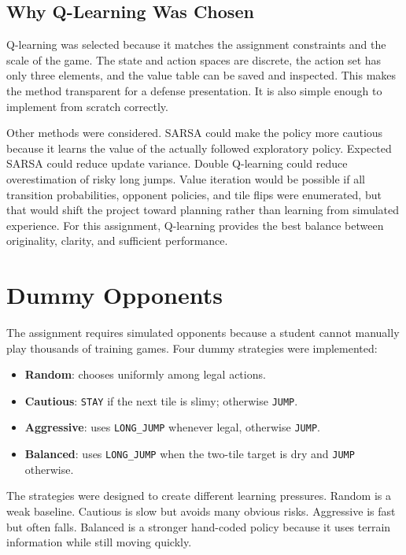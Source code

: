 \documentclass[conference]{IEEEtran}
\begin{document}
\subsection{Why Q-Learning Was Chosen}

Q-learning was selected because it matches the assignment constraints and the
scale of the game. The state and action spaces are discrete, the action set has
only three elements, and the value table can be saved and inspected. This makes the
method transparent for a defense presentation. It is also simple enough to
implement from scratch correctly.

Other methods were considered. SARSA could make the policy more cautious because
it learns the value of the actually followed exploratory policy. Expected SARSA
could reduce update variance. Double Q-learning could reduce overestimation of
risky long jumps. Value iteration would be possible if all transition
probabilities, opponent policies, and tile flips were enumerated, but that would
shift the project toward planning rather than learning from simulated experience.
For this assignment, Q-learning provides the best balance between originality,
clarity, and sufficient performance.

\section{Dummy Opponents}

The assignment requires simulated opponents because a student cannot manually play
thousands of training games. Four dummy strategies were implemented:

\begin{itemize}
\item \textbf{Random}: chooses uniformly among legal actions.
\item \textbf{Cautious}: \texttt{STAY} if the next tile is slimy; otherwise \texttt{JUMP}.
\item \textbf{Aggressive}: uses \texttt{LONG\_JUMP} whenever legal, otherwise
\texttt{JUMP}.
\item \textbf{Balanced}: uses \texttt{LONG\_JUMP} when the two-tile target is dry and 
\texttt{JUMP} otherwise.
\end{itemize}

The strategies were designed to create different learning pressures. Random is a
weak baseline. Cautious is slow but avoids many obvious risks. Aggressive is fast
but often falls. Balanced is a stronger hand-coded policy because it uses terrain
information while still moving quickly.
\end{document}
